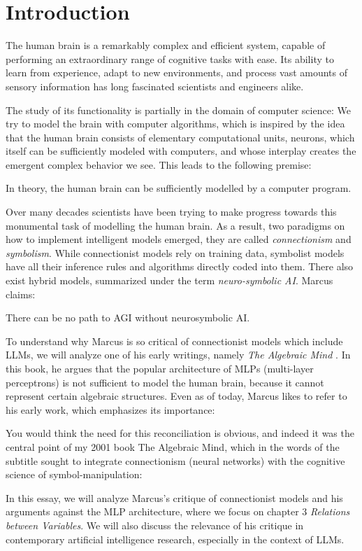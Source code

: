 \documentclass[../../main.tex]{subfiles}
\begin{document}
    \chapter{Introduction}
    The human brain is a remarkably complex and efficient system, capable of performing an extraordinary range of cognitive tasks with ease. Its ability to learn from experience, adapt to new environments, and process vast amounts of sensory information has long fascinated scientists and engineers alike.

    The study of its functionality is partially in the domain of computer science: We try to model the brain with computer algorithms, which is inspired by the idea that the human brain consists of elementary computational units, neurons, which itself can be sufficiently modeled with computers, and whose interplay creates the emergent complex behavior we see. This leads to the following premise:

    \begin{premise}
        In theory, the human brain can be sufficiently modelled by a computer program.
    \end{premise}

    Over many decades scientists have been trying to make progress towards this monumental task of modelling the human brain. As a result, two paradigms on how to implement intelligent models emerged, they are called \emph{connectionism} and \emph{symbolism}. While connectionist models rely on training data, symbolist models have all their inference rules and algorithms directly coded into them. There also exist hybrid models, summarized under the term \emph{neuro-symbolic AI}. Marcus claims:

    \begin{citecallout}
        There can be no path to AGI without neurosymbolic AI.
    \end{citecallout}

    To understand why Marcus is so critical of connectionist models which include LLMs, we will analyze one of his early writings, namely \emph{The Algebraic Mind} \cite{marcus_algebraic_mind}. In this book, he argues that the popular architecture of MLPs (multi-layer perceptrons) is not sufficient to model the human brain, because it cannot represent certain algebraic structures. Even as of today, Marcus likes to refer to his early work, which emphasizes its importance:

    \begin{citecallout}
        You would think the need for this reconciliation is obvious, and indeed it was the central point of my 2001 book The Algebraic Mind, which in the words of the subtitle sought to integrate connectionism (neural networks) with the cognitive science of symbol-manipulation:
    \end{citecallout}

    In this essay, we will analyze Marcus's critique of connectionist models and his arguments against the MLP architecture, where we focus on chapter 3 \textit{Relations between Variables}. We will also discuss the relevance of his critique in contemporary artificial intelligence research, especially in the context of LLMs.  
\end{document}
